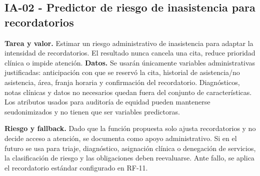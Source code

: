 \documentclass[11pt,a4paper]{article}
\begin{document}
\subsection{IA-02 - Predictor de riesgo de inasistencia para recordatorios}
\textbf{Tarea y valor.} Estimar un riesgo administrativo de inasistencia para adaptar la intensidad de recordatorios. El resultado nunca cancela una cita, reduce prioridad clínica o impide atención.
\textbf{Datos.} Se usarán únicamente variables administrativas justificadas: anticipación con que se reservó la cita, historial de asistencia/no asistencia, área, franja horaria y confirmación del recordatorio. Diagnósticos, notas clínicas y datos no necesarios quedan fuera del conjunto de características. Los atributos usados para auditoría de equidad pueden mantenerse seudonimizados y no tienen que ser variables predictoras.

\textbf{Riesgo y fallback.} Dado que la función propuesta solo ajusta recordatorios y no decide acceso a atención, se documenta como apoyo administrativo. Si en el futuro se usa para triaje, diagnóstico, asignación clínica o denegación de servicios, la clasificación de riesgo y las obligaciones deben reevaluarse. Ante fallo, se aplica el recordatorio estándar configurado en RF-11.
\end{document}
